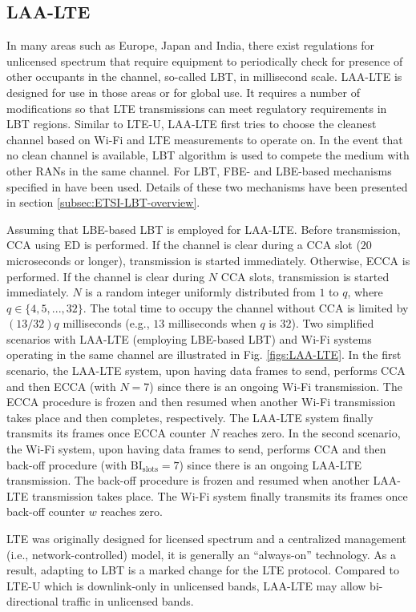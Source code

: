 \subsection{LAA-LTE}

\noindent In many areas such as Europe, Japan and India, there exist regulations for unlicensed spectrum that require equipment to periodically check for presence of other occupants in the channel, so-called LBT, in millisecond scale. LAA-LTE is designed for use in those areas or for global use. It requires a number of modifications so that LTE transmissions can meet regulatory requirements in LBT regions. Similar to LTE-U, LAA-LTE first tries to choose the cleanest channel based on Wi-Fi and LTE measurements to operate on. In the event that no clean channel is available, LBT algorithm is used to compete the medium with other RANs in the same channel. For LBT, FBE- and LBE-based mechanisms specified in \cite{LBT-ETSI-2014} have been used. Details of these two mechanisms have been presented in section \ref{subsec:ETSI-LBT-overview}.

Assuming that LBE-based LBT is employed for LAA-LTE. Before transmission, CCA using ED is performed. If the channel is clear during a CCA slot ($20$ microseconds or longer), transmission is started immediately. Otherwise, ECCA is performed. If the channel is clear during $N$ CCA slots, transmission is started immediately. $N$ is a random integer uniformly distributed from $1$ to $q$, where $q \in \{4,5,...,32\}$. The total time to occupy the channel without CCA is limited by $(13/32)q$ milliseconds (e.g., $13$ milliseconds when $q$ is $32$). Two simplified scenarios with LAA-LTE (employing LBE-based LBT) and Wi-Fi systems operating in the same channel are illustrated in Fig. \ref{figs:LAA-LTE}. In the first scenario, the LAA-LTE system, upon having data frames to send, performs CCA and then ECCA (with $N=7$) since there is an ongoing Wi-Fi transmission. The ECCA procedure is frozen and then resumed when another Wi-Fi transmission takes place and then completes, respectively. The LAA-LTE system finally transmits its frames once ECCA counter $N$ reaches zero. In the second scenario, the Wi-Fi system, upon having data frames to send, performs CCA and then back-off procedure (with $\mathrm{BI_{slots}} = 7$) since there is an ongoing LAA-LTE transmission. The back-off procedure is frozen and resumed when another LAA-LTE transmission takes place. The Wi-Fi system finally transmits its frames once back-off counter $w$ reaches zero.

LTE was originally designed for licensed spectrum and a centralized management (i.e., network-controlled) model, it is generally an ``always-on'' technology. As a result, adapting to LBT is a marked change for the LTE protocol. Compared to LTE-U which is downlink-only in unlicensed bands, LAA-LTE may allow bi-directional traffic in unlicensed bands.

